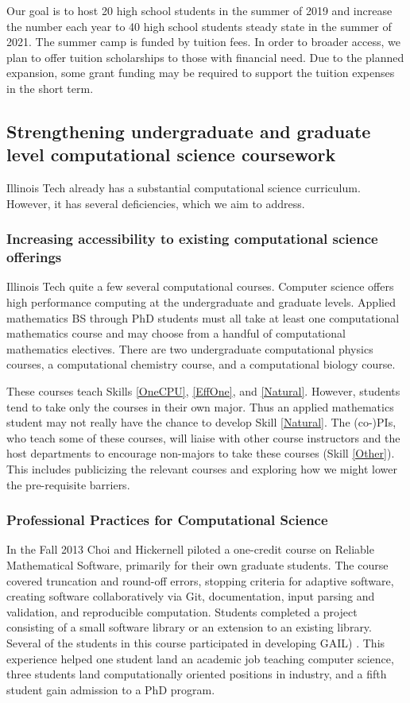 \documentclass[11pt]{NSFamsart}
\begin{document}
Our goal is to host 20 high school students in the summer of 2019 and increase the number each year to 40 high school students steady state in the summer of 2021.  The summer camp is funded by tuition fees.  In order to broader access, we plan to offer tuition scholarships to those with financial need.  Due to the planned expansion, some grant funding may be required to support the tuition expenses in the short term.

\subsection{Strengthening undergraduate and graduate level computational science coursework} \label{Curr} 
Illinois Tech already has a substantial computational science curriculum.  However, it has several deficiencies, which we aim to address.

\subsubsection{Increasing accessibility to existing computational science offerings} \label{CurrExist} Illinois Tech quite a few several computational courses.  Computer science offers high performance computing at the undergraduate and graduate levels.  Applied mathematics BS through PhD students must all take at least one computational mathematics course and may choose from a handful of computational mathematics electives. There are two undergraduate computational physics courses, a computational chemistry course, and a computational biology course.

These courses teach Skills \ref{OneCPU}, \ref{EffOne}, and \ref{Natural}.  However, students tend to take only the courses in their own major.  Thus an applied mathematics student may not really have the chance to develop Skill \ref{Natural}.  The (co-)PIs, who teach some of these courses, will liaise  with other course instructors and the host departments to encourage non-majors to take these courses (Skill \ref{Other}).  This includes publicizing the relevant courses and exploring how we might lower the pre-requisite barriers.

\subsubsection{Professional Practices for Computational Science} \label{RelSoft} In the Fall 2013 Choi and Hickernell piloted a one-credit course on Reliable Mathematical Software, primarily for their own graduate students.  The course covered truncation and round-off errors,
stopping criteria for adaptive software,
creating software collaboratively via Git, 
documentation,
input parsing and validation, and
reproducible computation.
Students completed a project consisting of a small software library or an extension to an existing library.  Several of the students in this course participated in developing GAIL) \cite{ChoEtal17b}.  This experience helped one student land an academic job teaching computer science, three students land computationally oriented positions in industry, and a fifth student gain admission to a PhD program.
\end{document}
